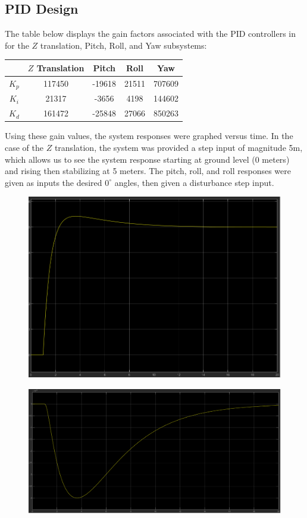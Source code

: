 \documentclass[12pt]{article}
\begin{document}
\subsection*{PID Design}
The table below displays the gain factors associated with the PID controllers in for the $Z$ translation, Pitch, Roll, and Yaw subsystems:
\begin{center}
  \begin{tabular}{||c c c c c||} 
  \hline
   & $Z$ Translation & Pitch & Roll & Yaw \\ [0.5ex] 
  \hline\hline
  $K_p$ & 117450 & -19618 & 21511 & 707609 \\ 
  \hline
  $K_i$ & 21317 & -3656 & 4198 & 144602 \\
  \hline
  $K_d$ & 161472 & -25848 & 27066 & 850263 \\
  \hline
 \end{tabular}
\end{center}
Using these gain values, the system responses were graphed versus time. In the case of the $Z$ translation, the system was provided a 
step input of magnitude 5m, which allows us to see the system response starting at ground level (0 meters) and rising then stabilizing at 5 meters.
The pitch, roll, and roll responses were given as inputs the desired $0^{\circ}$ angles, then given a disturbance step input.
\begin{figure}[h]
\includegraphics[width=0.9\linewidth]{images/Z_response.png}
\centering
\end{figure}

\begin{figure}[h]
\includegraphics[width=0.9\linewidth]{images/Pitch_response.png}
\centering
\end{figure}
\end{document}
